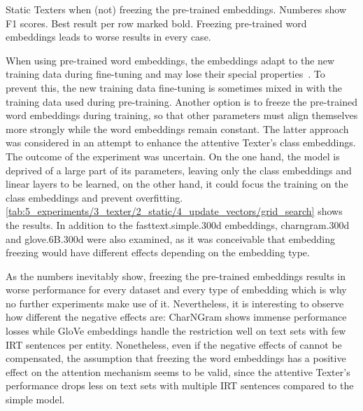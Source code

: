 \begin{table}
    \centering
    
    \caption{Static Texters when (not) freezing the pre-trained embeddings. Numberes show F1 scores. Best result per row marked bold. Freezing pre-trained word embeddings leads to worse results in every case.}
    \label{tab:5_experiments/3_texter/2_static/4_update_vectors/grid_search}
\end{table}

When using pre-trained word embeddings, the embeddings adapt to the new training data during fine-tuning and may lose their special properties~\cite{He2019AnalyzingTF}. To prevent this, the new training data fine-tuning is sometimes mixed in with the training data used during pre-training. Another option is to freeze the pre-trained word embeddings during training, so that other parameters must align themselves more strongly while the word embeddings remain constant. The latter approach was considered in an attempt to enhance the attentive Texter's class embeddings. The outcome of the experiment was uncertain. On the one hand, the model is deprived of a large part of its parameters, leaving only the class embeddings and linear layers to be learned, on the other hand, it could focus the training on the class embeddings and prevent overfitting. \autoref{tab:5_experiments/3_texter/2_static/4_update_vectors/grid_search} shows the results. In addition to the fasttext.simple.300d embeddings, charngram.300d and glove.6B.300d were also examined, as it was conceivable that embedding freezing would have different effects depending on the embedding type.

As the numbers inevitably show, freezing the pre-trained embeddings results in worse performance for every dataset and every type of embedding which is why no further experiments make use of it. Nevertheless, it is interesting to observe how different the negative effects are: CharNGram shows immense performance losses while GloVe embeddings handle the restriction well on text sets with few IRT sentences per entity. Nonetheless, even if the negative effects of cannot be compensated, the assumption that freezing the word embeddings has a positive effect on the attention mechanism seems to be valid, since the attentive Texter's performance drops less on text sets with multiple IRT sentences compared to the simple model.
